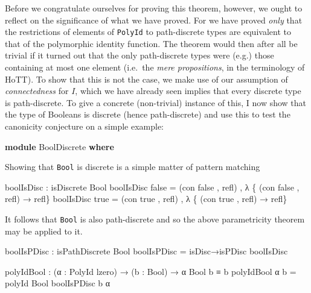 \documentclass[
  12pt]{article}
\newenvironment{Shaded}{\begin{snugshade}}{\end{snugshade}}
\newcommand{\KeywordTok}[1]{\textcolor[rgb]{0.12,0.11,0.11}{\textbf{#1}}}
\newcommand{\NormalTok}[1]{\textcolor[rgb]{0.12,0.11,0.11}{#1}}
\newcommand{\OtherTok}[1]{\textcolor[rgb]{0.00,0.43,0.16}{#1}}
\begin{document}
Before we congratulate ourselves for proving this theorem, however, we
ought to reflect on the significance of what we have proved. For we have
proved \emph{only} that the restrictions of elements of \texttt{PolyId}
to path-discrete types are equivalent to that of the polymorphic
identity function. The theorem would then after all be trivial if it
turned out that the only path-discrete types were (e.g.) those
containing at most one element (i.e.~the \emph{mere propositions}, in
the terminology of HoTT). To show that this is not the case, we make use
of our assumption of \emph{connectedness} for \(I\), which we have
already seen implies that every discrete type is path-discrete. To give
a concrete (non-trivial) instance of this, I now show that the type of
Booleans is discrete (hence path-discrete) and use this to test the
canonicity conjecture on a simple example:

\begin{Shaded}
\begin{Highlighting}[]
\KeywordTok{module}\NormalTok{ BoolDiscrete }\KeywordTok{where}
\end{Highlighting}
\end{Shaded}

Showing that \texttt{Bool} is discrete is a simple matter of pattern
matching

\begin{Shaded}
\begin{Highlighting}[]
\NormalTok{    boolIsDisc }\OtherTok{:}\NormalTok{ isDiscrete Bool}
\NormalTok{    boolIsDisc false }\OtherTok{=} \OtherTok{(}\NormalTok{con false , refl}\OtherTok{)}\NormalTok{ , }\OtherTok{λ} \OtherTok{\{} \OtherTok{(}\NormalTok{con false , refl}\OtherTok{)} \OtherTok{→}\NormalTok{ refl}\OtherTok{\}}
\NormalTok{    boolIsDisc true  }\OtherTok{=} \OtherTok{(}\NormalTok{con true  , refl}\OtherTok{)}\NormalTok{ , }\OtherTok{λ} \OtherTok{\{} \OtherTok{(}\NormalTok{con true , refl}\OtherTok{)} \OtherTok{→}\NormalTok{ refl}\OtherTok{\}}
\end{Highlighting}
\end{Shaded}

It follows that \texttt{Bool} is also path-discrete and so the above
parametricity theorem may be applied to it.

\begin{Shaded}
\begin{Highlighting}[]
\NormalTok{    boolIsPDisc }\OtherTok{:}\NormalTok{ isPathDiscrete Bool}
\NormalTok{    boolIsPDisc }\OtherTok{=}\NormalTok{ isDisc→isPDisc boolIsDisc}

\NormalTok{    polyIdBool }\OtherTok{:} \OtherTok{(}\NormalTok{α }\OtherTok{:}\NormalTok{ PolyId lzero}\OtherTok{)} \OtherTok{→} \OtherTok{(}\NormalTok{b }\OtherTok{:}\NormalTok{ Bool}\OtherTok{)} \OtherTok{→}\NormalTok{ α Bool b ≡ b}
\NormalTok{    polyIdBool α b }\OtherTok{=}\NormalTok{ polyId Bool boolIsPDisc b α}
\end{Highlighting}
\end{Shaded}
\end{document}
